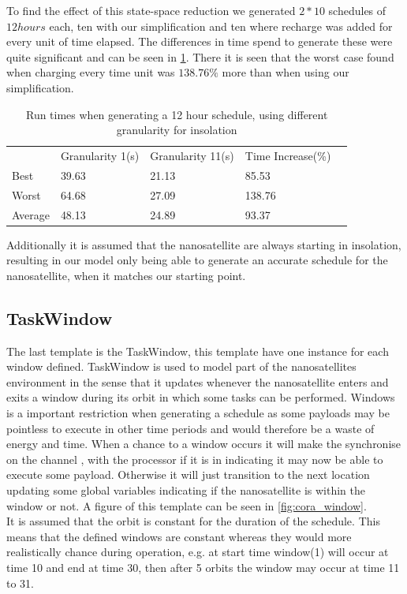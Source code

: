 To find the effect of this state-space reduction we generated $2 * 10$ schedules of $12hours$ each, ten with our simplification and ten where recharge was added for every unit of time elapsed. The differences in time spend to generate these were quite significant and can be seen in \cref{tab:runTimes}. There it is seen that the worst case found when charging every time unit was $138.76\%$ more than when using our simplification.

\begin{table}[H]
	\centering
	\begin{tabular}{lllll}
		& Granularity 1(s)           & Granularity 11(s)          & Time Increase(\%)           &  \\ \cline{2-4}
		\multicolumn{1}{l|}{Best}    & \multicolumn{1}{l|}{39.63} & \multicolumn{1}{l|}{21.13} & \multicolumn{1}{l|}{85.53}  &  \\
		\multicolumn{1}{l|}{Worst}   & \multicolumn{1}{l|}{64.68} & \multicolumn{1}{l|}{27.09} & \multicolumn{1}{l|}{138.76} &  \\
		\multicolumn{1}{l|}{Average} & \multicolumn{1}{l|}{48.13} & \multicolumn{1}{l|}{24.89} & \multicolumn{1}{l|}{93.37}  &  \\ \cline{2-4}
	\end{tabular}
		\caption{Run times when generating a 12 hour schedule, using different granularity for insolation}
		\label{tab:runTimes}
\end{table}
		
Additionally it is assumed that the nanosatellite are always starting in insolation, resulting in our model only being able to generate an accurate schedule for the nanosatellite, when it matches our starting point.


\subsection*{TaskWindow}\label{ssec:cora_tw}
The last template is the TaskWindow, this template have one instance for each window defined. TaskWindow is used to model part of the nanosatellites environment in the sense that it updates whenever the nanosatellite enters and exits a window during its orbit in which some tasks can be performed. Windows is a important restriction when generating a schedule as some payloads may be pointless to execute in other time periods and would therefore be a waste of energy and time. When a chance to a window occurs it will make the synchronise on the channel , with the processor if it is in  indicating it may now be able to execute some payload. Otherwise it will just transition to the next location updating some global variables indicating if the nanosatellite is within the window or not. 
A figure of this template can be seen in \cref{fig:cora_window}.\\
It is assumed that the orbit is constant for the duration of the schedule. This means that the defined windows are constant whereas they would more realistically chance during operation, e.g. at start time window(1) will occur at time 10 and end at time 30, then after 5 orbits the window may occur at time 11 to 31.

